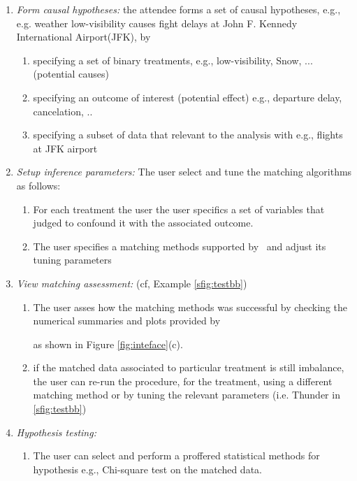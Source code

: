 \begin{enumerate}
  \item {\it Form causal hypotheses:} the attendee forms a set of causal hypotheses, e.g., 
   e.g. weather low-visibility causes fight delays at John F. Kennedy International Airport(JFK), by
    \begin{enumerate}
      \item specifying a set of binary treatments, e.g., low-visibility, Snow, ... (potential causes)
      \item specifying an outcome of interest (potential effect) e.g., departure delay, cancelation, ..
      \item specifying a subset of data that relevant to the analysis with e.g., flights at JFK airport
    \end{enumerate}
 
  \item {\it Setup inference parameters:} The user select and tune the matching algorithms as follows:
     \begin{enumerate}
      \item For each treatment the user the user specifics a set of variables that judged to confound it with the associated outcome.  
          \item The user specifies a matching methods supported by \GSQL\ and adjust its tuning parameters 
\end{enumerate}

  \item {\it View matching assessment:} (cf, Example \ref{sfig:testbb})
    \begin{enumerate}
      \item The user asses how the matching methods was successful by checking the numerical summaries and plots provided by \GSQL {} as shown in Figure \ref{fig:inteface}(c).
      \item
      if the matched data associated to  particular treatment is still imbalance, the user can re-run the procedure, for the treatment,
        using a different matching method or by tuning the relevant parameters (i.e. Thunder in \ref{sfig:testbb})
    \end{enumerate}
  \item {\it Hypothesis testing:} 
    \begin{enumerate}
      \item The user can select and perform a proffered statistical methods for hypothesis e.g., Chi-square test on the matched data.
    \end{enumerate}
\end{enumerate}


